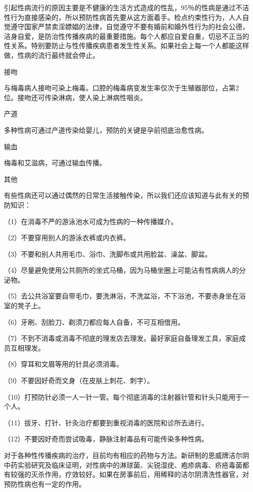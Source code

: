 \documentclass[12pt,UTF8]{ctexbook}
\begin{document}
引起性病流行的原因主要是不健康的生活方式造成的性乱，95％的性病是通过不洁性行为直接感染的，所以预防性病首先要从这方面着手。检点约束性行为，人人自觉遵守国家严禁卖淫嫖娼的法律，自觉遵守不要有婚前和婚外性行为的社会公德，洁身自爱，是防治性传播疾病的最重要措施。每个人都应自爱自重，切忌不正当的性关系。特别要防止与性传播疾病患者发生性关系。如果社会上每一个人都能这样做，性病的流行最终就会停止。

接吻

与梅毒病人接吻可染上梅毒。口腔的梅毒病变发生率仅次于生殖器部位，占第2位。接吻还可传染淋病，使人染上淋病性咽炎。

产道

多种性病可通过产道传染给婴儿，预防的关键是孕前彻底治愈性病。

输血

梅毒和艾滋病，可通过输血传播。

其他

有些性病还可以通过偶然的日常生活接触传染，所以我们还应该知道与此有关的预防知识：

（1）在消毒不严的游泳池水可成为性病的一种传播媒介。

（2）不要穿用别人的游泳衣裤或内衣裤。

（3）不要和别人共用毛巾、浴巾、洗脚布或共用脸盆、澡盆、脚盆。

（4）尽量避免使用公共厕所的坐式马桶，因为马桶坐圈上可能沾有性病病人的分泌物。

（5）去公共浴室要自带毛巾，要洗淋浴，不洗盆浴，不下浴池，不要赤身坐在浴室的凳子上。

（6）牙刷、刮脸刀、剃须刀都应每人自备，不可互相借用。

（7）不到不消毒或消毒不彻底的理发店去理发。最好家庭自备理发工具，家庭成员互相理发。

（8）穿耳和文眉等用的针具必须消毒。

（9）不要因好奇而文身（在皮肤上刺花、刺字）。

（10）打预防针必须一人一针一管。每个彻底消毒的注射器针管和针头只能用于一个人。

（11）拔牙、打针、针灸治疗都要到重视消毒的医院和诊所去进行。

（12）不要因好奇而尝试吸毒，静脉注射毒品有可能传染多种性病。

对于各种性传播疾病的治疗，目前均有相应的药物与方法。新研制的恩威牌洁尔阴中药实验研究及临床证明，对性病中的淋球菌、尖锐湿疣、疱疹病毒、疥疮毒菌都有较强的灭杀作用，疗效较好。如果在房事前后，用稀释的洁尔阴清洗性器官，对预防性病也有一定的作用。
\end{document}
